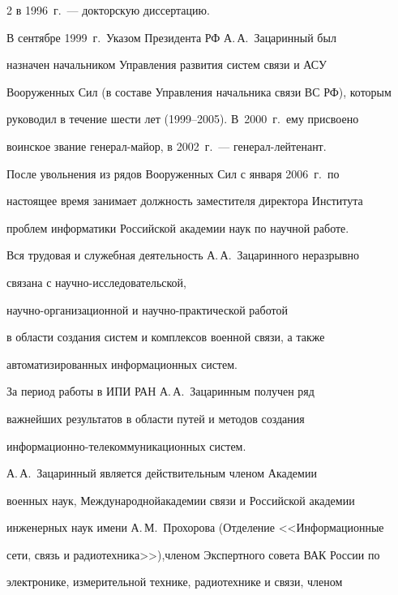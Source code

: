 \begin{multicols}{2}
в 1996~г.~--- докторскую диссертацию.

     

     В сентябре 1999~г.\ Указом Президента РФ А.\,А.~Зацаринный был 

назначен начальником Управ\-ле\-ния развития систем связи и АСУ 

Вооруженных Сил (в составе Управления начальника связи ВС РФ), которым 

руководил в течение шести лет (1999--2005). В~2000~г.\ ему присвоено 

воинское звание ге\-не\-рал-майор, в 2002~г.~--- ге\-не\-рал-лей\-те\-нант. 

     

     После увольнения из рядов Вооруженных Сил с января 2006~г.\ по 

настоящее время занимает должность заместителя директора Института 

проблем информатики Российской академии наук по научной работе.



Вся трудовая и служебная деятельность А.\,А.~Зацаринного неразрывно 

связана с на\-уч\-но-ис\-сле\-до\-ва\-тель\-ской, 

на\-уч\-но-ор\-га\-ни\-за\-ци\-он\-ной и на\-уч\-но-прак\-ти\-че\-ской работой 

в области создания систем и комплексов военной связи, а также 

автоматизированных информационных систем.

     

     За период работы в ИПИ РАН А.\,А.~Зацаринным получен ряд 

важнейших результатов в области путей и методов создания 

     ин\-фор\-ма\-ци\-он\-но-те\-ле\-ком\-му\-ни\-ка\-ци\-он\-ных систем.

     

     А.\,А.~Зацаринный является действительным членом Академии 

военных наук, Международной\linebreak академии связи и Российской академии 

инженерных наук имени А.\,М.~Прохорова (Отделение <<Информационные 

сети, связь и радиотехника>>),\linebreak членом Экспертного совета ВАК России по 

электронике, измерительной технике, радиотехнике и связи, членом 


\end{multicols}
